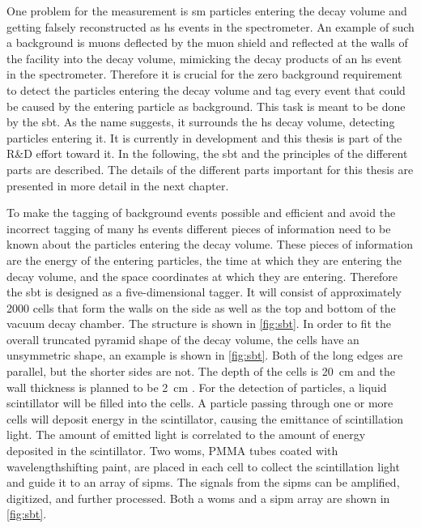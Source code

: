 One problem for the measurement is \ac{sm} particles entering the decay volume and getting falsely reconstructed as \ac{hs} events in the spectrometer.
An example of such a background is muons deflected by the muon shield and reflected at the walls of the facility into the decay volume, mimicking the decay products of an \ac{hs} event in the spectrometer.
Therefore it is crucial for the zero background requirement to detect the particles entering the decay volume and tag every event that could be caused by the entering particle as background.
This task is meant to be done by the \ac{sbt}.
As the name suggests, it surrounds the \ac{hs} decay volume, detecting particles entering it.
It is currently in development and this thesis is part of the R\&D effort toward it.
In the following, the \ac{sbt} and the principles of the different parts are described.
The details of the different parts important for this thesis are presented in more detail in the next chapter.

To make the tagging of background events possible and efficient and avoid the incorrect tagging of many \ac{hs} events different pieces of information need to be known about the particles entering the decay volume.
These pieces of information are the energy of the entering particles, the time at which they are entering the decay volume, and the space coordinates at which they are entering.
Therefore the \ac{sbt} is designed as a five-dimensional tagger.
It will consist of approximately 2000 cells that form the walls on the side as well as the top and bottom of the vacuum decay chamber.
The structure is shown in \autoref{fig:sbt}.
In order to fit the overall truncated pyramid shape of the decay volume, the cells have an unsymmetric shape, an example is shown in \autoref{fig:sbt}.
Both of the long edges are parallel, but the shorter sides are not.
The depth of the cells is \SI{20}{\centi\meter} and the wall thickness is planned to be \SI{2}{\centi\meter} \cite{}.
For the detection of particles, a liquid scintillator will be filled into the cells.
A particle passing through one or more cells will deposit energy in the scintillator, causing the emittance of scintillation light.
The amount of emitted light is correlated to the amount of energy deposited in the scintillator.
Two \acp{wom}, PMMA tubes coated with wavelengthshifting paint, are placed in each cell to collect the scintillation light and guide it to an array of \acp{sipm}.
The signals from the \acp{sipm} can be amplified, digitized, and further processed.
Both a \acp{wom} and a \ac{sipm} array are shown in \autoref{fig:sbt}.


